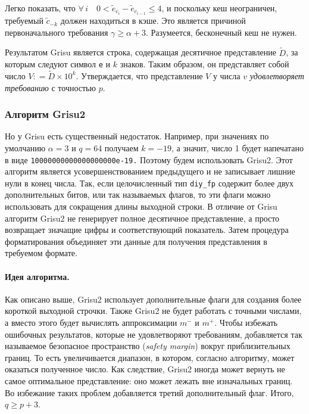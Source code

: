 Легко показать, что $\forall \, i \quad 0 < \tilde{e}_{c_i} - \tilde{e}_{c_{i-1}} \leqslant 4$, и поскольку кеш неограничен, требуемый $\tilde{c}_{-k}$ должен находиться в кэше. 
Это является причиной первоначального требования $\gamma \geqslant \alpha + 3$.
Разумеется, бесконечный кеш не нужен. 

Результатом \textsf{Grisu} является строка, содержащая десятичное представление $\tilde{D}$, за которым следуют символ \texttt{e} и $k$ знаков. 
Таким образом, он представляет собой число $V: = \tilde{D} \times 10^k$. 
Утверждается, что представление $V$ у числа $v$ \textit{удовлетворяет требованию} с точностью $p$.

\subsubsection{Алгоритм \textsf{Grisu2}}
Но у \textsf{Grisu} есть существенный недостаток.
Например, при значениях по умолчанию $\alpha = 3$ и $q=64$ получаем $k=-19$, а значит, число 1 будет напечатано в виде \texttt{10000000000000000000e-19.}
Поэтому будем использовать \textsf{Grisu2}.
Этот алгоритм является усовершенствованием предыдущего и не записывает лишние нули в конец числа.
Так, если целочисленный тип \texttt{diy\_fp} содержит более двух дополнительных битов, или так называемых флагов, то эти флаги можно использовать для сокращения длины выходной строки.
В отличие от \textsf{Grisu} алгоритм \textsf{Grisu2} не генерирует полное десятичное представление, а просто возвращает значащие цифры и соответствующий показатель. 
Затем процедура форматирования объединяет эти данные для получения представления в требуемом формате.

\paragraph{Идея алгоритма.} 
Как описано выше, \textsf{Grisu2} использует дополнительные флаги для создания более короткой выходной строчки. 
Также \textsf{Grisu2} не будет работать с точными числами, а вместо этого будет вычислять аппроксимации $m^{-}$ и $m^+$. 
Чтобы избежать ошибочных результатов, которые не удовлетворяют требованиям, добавляется так называемое безопасное пространство (\textit{safety margin}) вокруг приблизительных границ.
То есть увеличивается диапазон, в котором, согласно алгоритму, может оказаться полученное число.  
Как следствие, \textsf{Grisu2} иногда может вернуть не самое оптимальное представление: оно может лежать вне изначальных границ. 
Во избежание таких проблем добавляется третий дополнительный флаг. Итого, $q \geqslant p + 3$.

